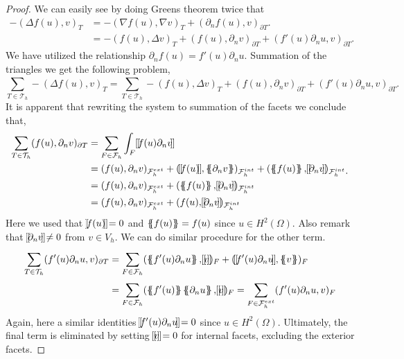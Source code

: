 \begin{proof}
  We can easily see by doing Greens theorem twice that \[
    \begin{split}
-(\Delta f( u) , v)_{T } &= -(\nabla f( u), \nabla v  )_{T } + ( \partial _{n}  f( u), v )_{\partial T }.\\
                    & = -( f( u), \Delta v )_{T} + (f( u), \partial _{n} v  )_{\partial T} + (   f'( u)\partial _{n}u, v )_{\partial T } .
    \end{split}
\]
We have utilized the relationship $\partial _{n} f(u) = f' ( u) \partial _{n}u$.
 Summation of the triangles we get the following problem,
\[
\sum_{T \in  \mathcal{T} _{h} }^{} -(\Delta f( u) , v)_{T } = \sum_{T \in \mathcal{T} _{h}}^{}  -( f( u), \Delta v )_{T} + (f( u), \partial _{n} v  )_{\partial T} + (   f'( u)\partial _{n}u, v )_{\partial T }.
\]
It is apparent that rewriting the system to summation of the facets we conclude that, \[
    \begin{split}
\sum_{T \in \mathcal{T}_{h} }^{} ( f( u) , \partial _{n}v)_{\partial T} & =  \sum_{F \in \mathcal{F}_{h} }^{} \int_{F}^{}  \jump{    f( u) \partial _{n}v}   \\
& = ( f(u), \partial _{n} v)_{\mathcal{F}^{ext}_{h} }  +  ( \jump{f( u)} , \mean{ \partial _{n}v }  )_{\mathcal{F} _{h}^{int}} + ( \mean{f( u)}
, \jump{ \partial _{n}v }  )_{\mathcal{F}^{int}_{h} } \\
 & = ( f(u), \partial _{n} v)_{\mathcal{F}^{ext}_{h} } +   ( \mean{f( u)} , \jump{ \partial _{n}v }  )_{\mathcal{F}^{int}_{h} } \\
 & = ( f(u), \partial _{n} v)_{\mathcal{F}^{ext}_{h} } +  ( f( u) , \jump{ \partial _{n}v }  )_{\mathcal{F} _{h}^{int}}
    \end{split}
    .
\]
Here we used that $ \left[\!\!\!\left[  f( u)   \right]\!\!\!\right] = 0  $ and $\left\{\!\!\left\{ f( u)  \right\}\!\!\right\} = f( u)  $  since $u \in H^2( \Omega ) $. Also remark that $\left[\!\!\!\left[  \partial _{n}v  \right]\!\!\!\right] \neq 0   $ from $v \in V_{h}$. We can do similar procedure for the other term.
\[
    \begin{split}
\sum_{T \in \mathcal{T} _{h}}^{} (   f'( u)\partial _{n}u, v )_{\partial T } & = \sum_{F \in \mathcal{F} _{h}}^{} (\mean{ f'( u)\partial _{n}u }  , \jump{ v }   )_{F} +  (\jump{ f'( u)\partial _{n}u }  , \mean{ v }   )_{F} \\
                                                                             & = \sum_{F \in \mathcal{F} _{h}}^{} (\mean{ f'( u)} \mean{ \partial _{n}u }  , \jump{ v }   )_{F} = \sum_{F \in \mathcal{F} _{h}^{ext}}^{} ( f'( u)  \partial _{n}u   ,  v
                                                                             )_{F}  \\
    \end{split}
\]
Again, here a similar identities $\left[\!\!\!\left[   f' ( u) \partial _{n} u \right]\!\!\!\right] = 0  $ since $u \in H^2( \Omega ) $. Ultimately, the final term is eliminated by setting $ \left[\!\!\!\left[ v \right]\!\!\!\right] = 0 $ for internal facets, excluding the exterior facets.
\end{proof}

